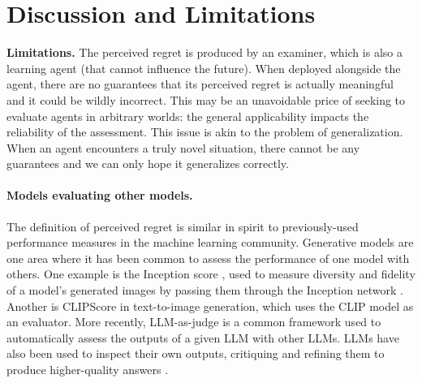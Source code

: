 \section{Discussion and Limitations}
\textbf{Limitations.} The perceived regret is produced by an examiner, which is also a learning agent (that cannot influence the future). When deployed alongside the agent, there are no guarantees that its perceived regret is actually meaningful and it could be wildly incorrect. 
This may be an unavoidable price of seeking to evaluate agents in arbitrary worlds: the general applicability impacts the reliability of the assessment. This issue is akin to the problem of generalization. When an agent encounters a truly novel situation, there cannot be any guarantees and we can only hope it generalizes correctly. 

\paragraph{Models evaluating other models.} The definition of perceived regret is similar in spirit to previously-used performance measures in the machine learning community. Generative models are one area where it has been common to assess the performance of one model with others. 
One example is the Inception score \citep{salimans2016improved}, used to measure diversity and fidelity of a model's generated images by passing them through the Inception network \citep{szegedy2016rethinking}. Another is CLIPScore \citep{hessel2021clipscore} in text-to-image generation, which uses the CLIP model \citep{radford2021clip} as an evaluator. More recently, LLM-as-judge \citep{zheng2023judging} is a common framework used to automatically assess the outputs of a given LLM with other LLMs. LLMs have also been used to inspect their own outputs, critiquing and refining them to produce higher-quality answers \citep{madaan2023selfrefine, shinn2023reflexion}. 

